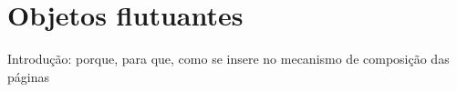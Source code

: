 \section{Objetos flutuantes}

Introdução: porque, para que, como se insere no mecanismo de
composição das páginas
